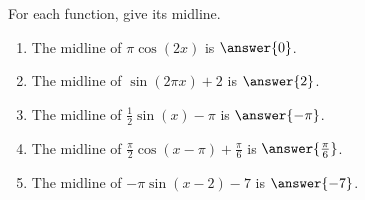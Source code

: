 \documentclass{ximera}
\author{Kenneth Berglund}
\begin{document}
\begin{exercise}
For each function, give its midline. 

\begin{enumerate}
\item The midline of $\pi\cos(2x)$ is $\answer{0}$.

\item The midline of $\sin(2\pi x) + 2$ is $\answer{2}$.

\item The midline of $\frac{1}{2}\sin(x) - \pi$ is $\answer{-\pi}$.

\item The midline of $\frac{\pi}{2}\cos(x - \pi) + \frac{\pi}{6}$ is $\answer{\frac{\pi}{6}}$.

\item The midline of $-\pi\sin(x - 2) - 7$ is $\answer{-7}$.
\end{enumerate}


\end{exercise}
\end{document}
